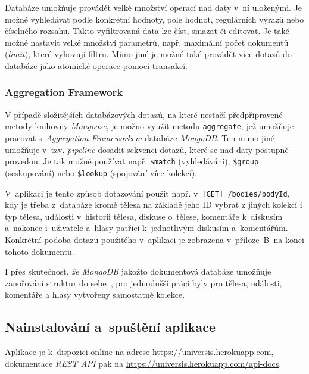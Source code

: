 \documentclass[a4paper,12pt]{article}
\def\code#1{\texttt{#1}}
\begin{document}
Databáze umožňuje provádět velké množství operací nad daty v~ní uloženými. Je možné vyhledávat podle konkrétní hodnoty, pole hodnot, regulárních výrazů nebo číselného rozsahu. Takto vyfiltrovaná data lze číst, smazat či editovat. Je také možné nastavit velké množství parametrů, např. maximální počet dokumentů (\textit{limit}), které vyhovují filtru. Mimo jiné je možné také provádět více dotazů do databáze jako atomické operace pomocí transakcí.~\cite{nodebook}



\subsubsection{Aggregation Framework}

V případě složitějších databázových dotazů, na které nestačí předpřipravené metody knihovny \textit{Mongoose}, je možno využít metodu \code{aggregate}, jež umožňuje pracovat s~\textit{Aggregation Frameworkem} databáze \textit{MongoDB}. Ten mimo jiné umožňuje v~tzv. \textit{pipeline} dosadit sekvenci dotazů, které se nad daty postupně provedou. Je tak možné používat např. \code{\$match} (vyhledávání), \code {\$group} (seskupování) nebo \code{\$lookup} (spojování více kolekcí).~\cite{aggregation}

V~aplikaci je tento způsob dotazování použit např. v~\code{[GET] /bodies/{bodyId}}, kdy je třeba z~databáze kromě tělesa na základě jeho ID vybrat z jiných kolekcí i typ tělesa, události v~historii tělesa, diskuse o~tělese, komentáře k~diskusím a~nakonec i~uživatele a~hlasy patřící k~jednotlivým diskusím a~komentářům. Konkrétní podoba dotazu použitého v~aplikaci je zobrazena v~příloze~B~na konci tohoto dokumentu.

I přes skutečnost, \textit{že MongoDB} jakožto dokumentová databáze umožňuje zanořování struktur do sebe~\cite{mongomongoose}, pro jednodušší práci byly pro tělesa, události, komentáře a hlasy vytvořeny samostatné kolekce.

\subsection{Nainstalování a~spuštění aplikace}

Aplikace je k~dispozici online na adrese \url{https://universis.herokuapp.com}, dokumentace \textit{REST API} pak na \url{https://universis.herokuapp.com/api-docs}.
\end{document}
